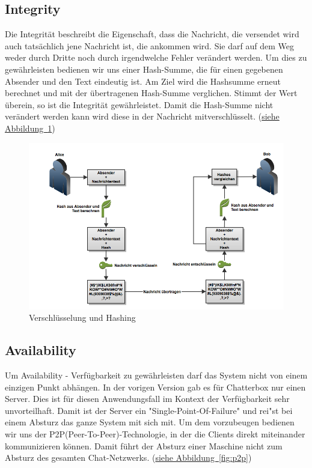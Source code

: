 \documentclass[12pt,a4paper,titlepage,oneside]{scrartcl}
\begin{document}
\subsection{Integrity}
Die Integrit\"at beschreibt die Eigenschaft, dass die Nachricht, die versendet wird auch tats\"achlich jene Nachricht ist, die ankommen wird. Sie darf auf dem Weg weder durch Dritte noch durch irgendwelche Fehler ver\"andert werden. Um dies zu gew\"ahrleisten bedienen wir uns einer Hash-Summe, die f\"ur einen gegebenen Absender und den Text eindeutig ist. Am Ziel wird die Hashsumme erneut berechnet und mit der \"ubertragenen Hash-Summe verglichen. Stimmt der Wert \"uberein, so ist die Integrit\"at gew\"ahrleistet. Damit die Hash-Summe nicht ver\"andert werden kann wird diese in der Nachricht mitverschl\"usselt. (\hyperref[fig:encryption]{siehe Abbildung~\ref*{fig:encryption}})

\begin{figure}[h!]
  \centering
    \includegraphics[width=1.0\textwidth]{./imgs/encryption.png}
  \caption{Verschl\"usselung und Hashing}
  \label{fig:encryption}
\end{figure}

\subsection{Availability}
Um Availability - Verf\"ugbarkeit zu gew\"ahrleisten darf das System nicht von einem einzigen Punkt abh\"angen. In der vorigen Version gab es f\"ur Chatterbox nur einen Server. Dies ist f\"ur diesen Anwendungsfall im Kontext der Verf\"ugbarkeit sehr unvorteilhaft. Damit ist der Server ein "Single-Point-Of-Failure" und rei"st bei einem Absturz das ganze System mit sich mit. Um dem vorzubeugen bedienen wir uns der P2P(Peer-To-Peer)-Technologie, in der die Clients direkt miteinander kommunizieren k\"onnen. Damit f\"uhrt der Absturz einer Maschine nicht zum Absturz des gesamten Chat-Netzwerks. (\hyperref[fig:p2p]{siehe Abbildung~\ref*{fig:p2p}})
\end{document}
